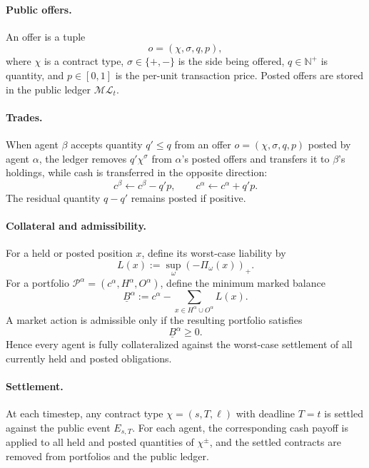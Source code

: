 \paragraph{Public offers.}
An offer is a tuple
\[
o=(\chi,\sigma,q,p),
\]
where $\chi$ is a contract type, $\sigma\in\{+,-\}$ is the side being offered, $q\in\mathbb N^+$ is quantity, and $p\in[0,1]$ is the per-unit transaction price. Posted offers are stored in the public ledger $\mathcal{ML}_t$.

\paragraph{Trades.}
When agent $\beta$ accepts quantity $q'\le q$ from an offer $o=(\chi,\sigma,q,p)$ posted by agent $\alpha$, the ledger removes $q'\chi^\sigma$ from $\alpha$'s posted offers and transfers it to $\beta$'s holdings, while cash is transferred in the opposite direction:
\[
c^\beta \leftarrow c^\beta - q'p,\qquad c^\alpha \leftarrow c^\alpha + q'p.
\]
The residual quantity $q-q'$ remains posted if positive.

\paragraph{Collateral and admissibility.}
For a held or posted position $x$, define its worst-case liability by
\[
L(x):=\sup_{\omega}(-\Pi_\omega(x))_+.
\]
For a portfolio $\mathcal P^\alpha=(c^\alpha,H^\alpha,O^\alpha)$, define the minimum marked balance
\[
\underline B^\alpha
:=
c^\alpha - \sum_{x\in H^\alpha\cup O^\alpha}L(x).
\]
A market action is admissible only if the resulting portfolio satisfies
\[
\underline B^\alpha \ge 0.
\]
Hence every agent is fully collateralized against the worst-case settlement of all currently held and posted obligations.

\paragraph{Settlement.}
At each timestep, any contract type $\chi=(s,T,\ell)$ with deadline $T=t$ is settled against the public event $E_{s,T}$. For each agent, the corresponding cash payoff is applied to all held and posted quantities of $\chi^\pm$, and the settled contracts are removed from portfolios and the public ledger.
